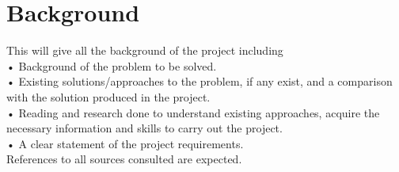 \chapter{Background}
\label{ch:background}

This will give all the background of the project including\\
• Background of the problem to be solved.\\
• Existing solutions/approaches to the problem, if any exist, and a comparison
with the solution produced in the project.\\
• Reading and research done to understand existing approaches, acquire the
necessary information and skills to carry out the project.\\
• A clear statement of the project requirements.\\
References to all sources consulted are expected. \\